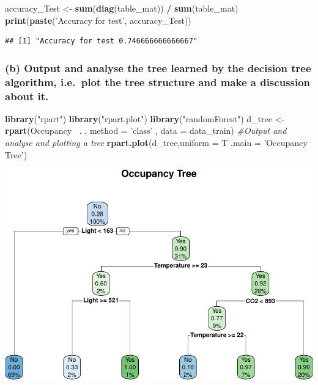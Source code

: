 \documentclass[]{article}
\newenvironment{Shaded}{\begin{snugshade}}{\end{snugshade}}
\newcommand{\CommentTok}[1]{\textcolor[rgb]{0.56,0.35,0.01}{\textit{#1}}}
\newcommand{\DataTypeTok}[1]{\textcolor[rgb]{0.13,0.29,0.53}{#1}}
\newcommand{\KeywordTok}[1]{\textcolor[rgb]{0.13,0.29,0.53}{\textbf{#1}}}
\newcommand{\NormalTok}[1]{#1}
\newcommand{\OperatorTok}[1]{\textcolor[rgb]{0.81,0.36,0.00}{\textbf{#1}}}
\newcommand{\StringTok}[1]{\textcolor[rgb]{0.31,0.60,0.02}{#1}}
\begin{document}
\begin{Shaded}
\begin{Highlighting}[]
\NormalTok{accuracy_Test <-}\StringTok{ }\KeywordTok{sum}\NormalTok{(}\KeywordTok{diag}\NormalTok{(table_mat)) }\OperatorTok{/}\StringTok{ }\KeywordTok{sum}\NormalTok{(table_mat)}
\KeywordTok{print}\NormalTok{(}\KeywordTok{paste}\NormalTok{(}\StringTok{'Accuracy for test'}\NormalTok{, accuracy_Test))}
\end{Highlighting}
\end{Shaded}

\begin{verbatim}
## [1] "Accuracy for test 0.746666666666667"
\end{verbatim}

\hypertarget{b-output-and-analyse-the-tree-learned-by-the-decision-tree-algorithm-i.e.-plot-the-tree-structure-and-make-a-discussion-about-it.}{%
\subsubsection{(b) Output and analyse the tree learned by the decision
tree algorithm, i.e.~plot the tree structure and make a discussion about
it.}\label{b-output-and-analyse-the-tree-learned-by-the-decision-tree-algorithm-i.e.-plot-the-tree-structure-and-make-a-discussion-about-it.}}

\begin{Shaded}
\begin{Highlighting}[]
\KeywordTok{library}\NormalTok{(}\StringTok{"rpart"}\NormalTok{)}
\KeywordTok{library}\NormalTok{(}\StringTok{"rpart.plot"}\NormalTok{)}
\KeywordTok{library}\NormalTok{(}\StringTok{"randomForest"}\NormalTok{)}
\NormalTok{d_tree <-}\KeywordTok{rpart}\NormalTok{(Occupancy }\OperatorTok{~}\NormalTok{. , }\DataTypeTok{method =} \StringTok{'class'}\NormalTok{ , }\DataTypeTok{data =}\NormalTok{ data_train)}
\CommentTok{#Output and analyse and plotting a tree}
\KeywordTok{rpart.plot}\NormalTok{(d_tree,}\DataTypeTok{uniform =}\NormalTok{ T ,}\DataTypeTok{main =} \StringTok{'Occupancy Tree'}\NormalTok{)}
\end{Highlighting}
\end{Shaded}

\includegraphics{BSc_CW2_12516369_S_Tariq_files/figure-latex/unnamed-chunk-2-1.pdf}
\end{document}
